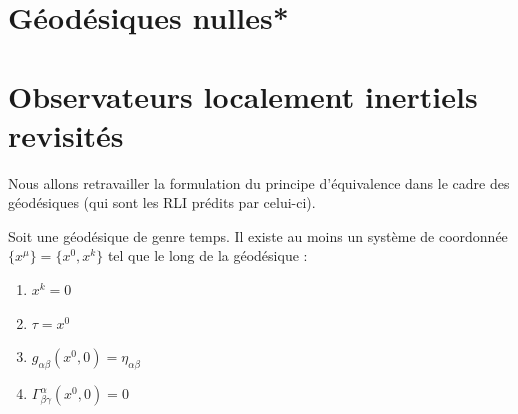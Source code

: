 \section{Géodésiques nulles*}
\section{Observateurs localement inertiels revisités}
Nous allons retravailler la formulation du principe d'équivalence dans le cadre des géodésiques (qui sont les RLI prédits par celui-ci).
\begin{theoremframe}
    \begin{theorem}
        Soit une géodésique de genre temps. Il existe au moins un système de coordonnée $\{x^{\mu}\} = \{x^0 , x^k\}$ tel que le long de la géodésique :
        \begin{enumerate}
            \item $x^k = 0$
            \item $\tau = x^0$ 
            \item $g_{\alpha \beta}(x^0, 0) = \eta_{\alpha \beta}$
            \item $\Gamma^{\alpha}_{\beta \gamma}(x^0, 0) = 0$
        \end{enumerate}
    \end{theorem}
\end{theoremframe}
